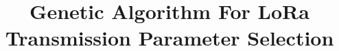 \documentclass[conference]{IEEEtran}
\begin{document}
\title{Genetic Algorithm For LoRa Transmission Parameter Selection}
\maketitle

	
	
	
	
	
	

\printbibliography
\end{document}
